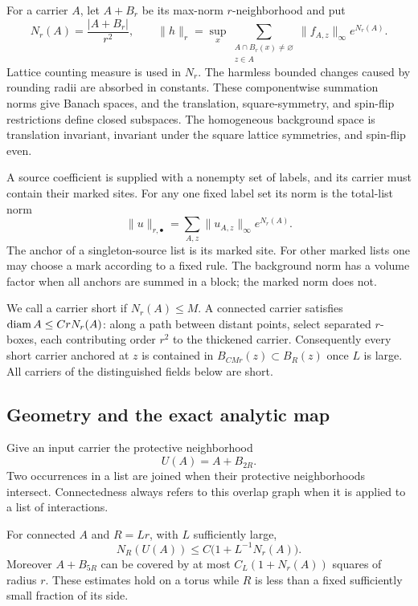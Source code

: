 For a carrier $A$, let $A+B_r$ be its max-norm $r$-neighborhood and put
\begin{equation}
 N_r(A)=\frac{|A+B_r|}{r^2},\qquad
 \|h\|_r=\sup_x
 \sum_{\substack{A\cap B_r(x)\ne\varnothing\\z\in A}}
       \|f_{A,z}\|_\infty e^{N_r(A)}.
 \label{rg:norm}
\end{equation}
Lattice counting measure is used in $N_r$.  The harmless bounded changes
caused by rounding radii are absorbed in constants.  These componentwise
summation norms give Banach spaces, and the translation, square-symmetry,
and spin-flip restrictions define closed subspaces.  The homogeneous
background space is translation invariant, invariant under the square
lattice symmetries, and spin-flip even.

A source coefficient is supplied with a nonempty set of labels, and its
carrier must contain their marked sites.  For any one fixed label set its
norm is the total-list norm
\begin{equation}
 \|u\|_{r,\bullet}=
 \sum_{A,z}\|u_{A,z}\|_\infty e^{N_r(A)}.
 \label{rg:marked-norm}
\end{equation}
The anchor of a singleton-source list is its marked site.  For other
marked lists one may choose a mark according to a fixed rule.  The
background norm has a volume factor when all anchors are summed in a
block; the marked norm does not.

We call a carrier short if $N_r(A)\le M$.  A connected carrier satisfies
$\operatorname{diam} A\le CrN_r(A)$: along a path between distant points, select
separated $r$-boxes, each contributing order $r^2$ to the thickened
carrier.  Consequently every short carrier anchored at $z$ is contained
in $B_{CMr}(z)\subset B_R(z)$ once $L$ is large.  All carriers of the
distinguished fields below are short.

\subsection{Geometry and the exact analytic map}

Give an input carrier the protective neighborhood
\[
 U(A)=A+B_{2R}.
\]
Two occurrences in a list are joined when their protective neighborhoods
intersect.  Connectedness always refers to this overlap graph when it is
applied to a list of interactions.

\begin{lemma}
\label{rg:geometry}
For connected $A$ and $R=Lr$, with $L$ sufficiently large,
\begin{equation}
 N_R(U(A))\le C\bigl(1+L^{-1}N_r(A)\bigr).
 \label{rg:geometry-eq}
\end{equation}
Moreover $A+B_{5R}$ can be covered by at most
$C_L(1+N_r(A))$ squares of radius $r$.  These estimates hold on a torus
while $R$ is less than a fixed sufficiently small fraction of its side.
\end{lemma}

